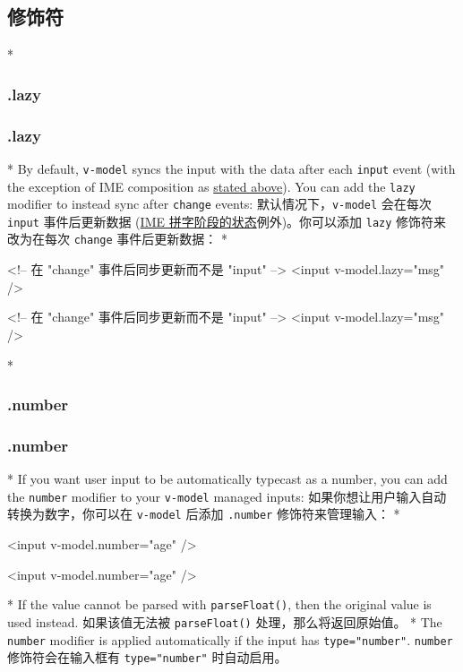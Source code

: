 \begin{paracol}{2}
\subsection{修饰符}
\switchcolumn[0]*%
\subsubsection{.lazy}
\switchcolumn
\subsubsection{.lazy}
\switchcolumn[0]*%
By default, \texttt{v-model} syncs the input with the data after each
\texttt{input} event (with the exception of IME composition as
\href{https://vuejs.org/guide/essentials/forms.html\#vmodel-ime-tip}{stated
above}). You can add the \texttt{lazy} modifier to instead sync after
\texttt{change} events:
\switchcolumn
默认情况下，\texttt{v-model} 会在每次 \texttt{input} 事件后更新数据
(\href{https://cn.vuejs.org/guide/essentials/forms.html\#vmodel-ime-tip}{IME
拼字阶段的状态}例外)。你可以添加 \texttt{lazy} 修饰符来改为在每次
\texttt{change} 事件后更新数据：
\switchcolumn[0]*%
\begin{codeHtml}
<!-- 在 "change" 事件后同步更新而不是 "input" -->
<input v-model.lazy="msg" />
\end{codeHtml}
\switchcolumn
\begin{codeHtml}
<!-- 在 "change" 事件后同步更新而不是 "input" -->
<input v-model.lazy="msg" />
\end{codeHtml}


\switchcolumn[0]*%
\subsubsection{.number}
\switchcolumn
\subsubsection{.number}
\switchcolumn[0]*%
If you want user input to be automatically typecast as a number, you can
add the \texttt{number} modifier to your \texttt{v-model} managed
inputs:
\switchcolumn
如果你想让用户输入自动转换为数字，你可以在 \texttt{v-model} 后添加
\texttt{.number} 修饰符来管理输入：
\switchcolumn[0]*%
\begin{codeHtml}
<input v-model.number="age" />
\end{codeHtml}
\switchcolumn
\begin{codeHtml}
<input v-model.number="age" />
\end{codeHtml}
\switchcolumn[0]*%
If the value cannot be parsed with \texttt{parseFloat()}, then the
original value is used instead.
\switchcolumn
如果该值无法被 \texttt{parseFloat()} 处理，那么将返回原始值。
\switchcolumn[0]*%
The \texttt{number} modifier is applied automatically if the input has
\texttt{type="number"}.
\switchcolumn
\texttt{number} 修饰符会在输入框有 \texttt{type="number"} 时自动启用。



\end{paracol}
